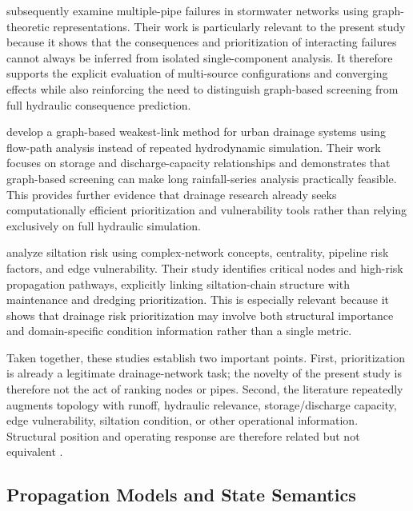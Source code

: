 \citet{dastgir2024} subsequently examine multiple-pipe failures in
stormwater networks using graph-theoretic representations. Their work is
particularly relevant to the present study because it shows that the
consequences and prioritization of interacting failures cannot always be
inferred from isolated single-component analysis. It therefore supports
the explicit evaluation of multi-source configurations and converging
effects while also reinforcing the need to distinguish graph-based
screening from full hydraulic consequence prediction.

\citet{meijer2023} develop a graph-based weakest-link method for
urban drainage systems using flow-path analysis instead of repeated
hydrodynamic simulation. Their work focuses on storage and
discharge-capacity relationships and demonstrates that graph-based
screening can make long rainfall-series analysis practically feasible.
This provides further evidence that drainage research already seeks
computationally efficient prioritization and vulnerability tools rather
than relying exclusively on full hydraulic simulation.

\citet{zhang2025} analyze siltation risk using complex-network
concepts, centrality, pipeline risk factors, and edge vulnerability.
Their study identifies critical nodes and high-risk propagation
pathways, explicitly linking siltation-chain structure with maintenance
and dredging prioritization. This is especially relevant because it
shows that drainage risk prioritization may involve both structural
importance and domain-specific condition information rather than a
single metric.

Taken together, these studies establish two important points. First,
prioritization is already a legitimate drainage-network task; the
novelty of the present study is therefore not the act of ranking nodes
or pipes. Second, the literature repeatedly augments topology with
runoff, hydraulic relevance, storage/discharge capacity, edge
vulnerability, siltation condition, or other operational information.
Structural position and operating response are therefore related but not
equivalent \citep{simone2022,simone2023,dastgir2023,meijer2023,zhang2025}.

\subsection{Propagation Models and State
Semantics}\label{propagation-models-and-state-semantics}

